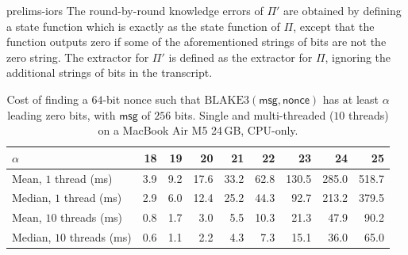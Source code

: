 \begin{lncsappendix}{prelims-iors}
 The round-by-round knowledge errors of $\Pi'$ are obtained by defining a state function which is exactly as the state function of $\Pi$, except that the function outputs zero if some of the aforementioned strings of bits are not the zero string. The extractor for $\Pi'$ is defined as the extractor for $\Pi$, ignoring the additional strings of bits in the transcript.

\begin{table}[H]
  \centering
  \small
  \setlength{\tabcolsep}{5pt}
  \caption{Cost of finding a $64$-bit nonce such that $\text{BLAKE3}(\mathsf{msg}, \mathsf{nonce})$ has at least $\alpha$ leading zero
    bits, with $\mathsf{msg}$ of $256$ bits. Single and multi-threaded ($10$ threads)  on a MacBook Air M5 24\,GB, CPU-only.}
  \label{tab:grinding-cost}
      \begin{tabular}{@{}l rrrrrrrr@{}}
    \toprule
    $\alpha$ & 18 & 19 & 20 & 21 & 22 & 23 & 24 & 25 \\
    \midrule
    Mean, $1$ thread (ms)     &    3.9 &    9.2 &   17.6 &   33.2 &   62.8 &  130.5 &  285.0 &  518.7 \\
    Median, $1$ thread (ms)   &    2.9 &    6.0 &   12.4 &   25.2 &   44.3 &   92.7 &  213.2 &  379.5 \\
    Mean, $10$ threads (ms)   &    0.8 &    1.7 &    3.0 &    5.5 &   10.3 &   21.3 &   47.9 &   90.2 \\
    Median, $10$ threads (ms) &    0.6 &    1.1 &    2.2 &    4.3 &    7.3 &   15.1 &   36.0 &   65.0 \\
    \bottomrule
  \end{tabular}
\end{table}
 

\end{lncsappendix}
